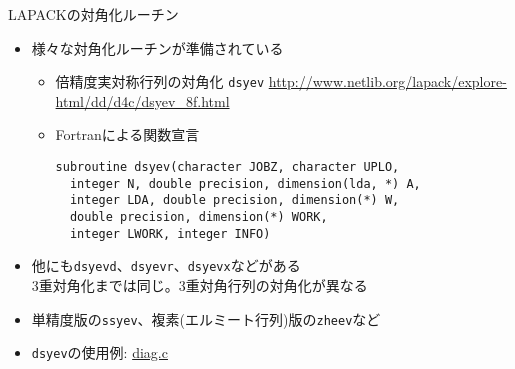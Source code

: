 \begin{frame}[t,fragile]{LAPACKの対角化ルーチン}
  \begin{itemize}
  \item 様々な対角化ルーチンが準備されている
    \begin{itemize}
    \item 倍精度実対称行列の対角化 {\tt dsyev}
      \url{http://www.netlib.org/lapack/explore-html/dd/d4c/dsyev_8f.html}
    \item Fortranによる関数宣言
\begin{lstlisting}
subroutine dsyev(character JOBZ, character UPLO,
  integer N, double precision, dimension(lda, *) A,
  integer LDA, double precision, dimension(*) W,
  double precision, dimension(*) WORK,
  integer LWORK, integer INFO)		
\end{lstlisting}
    \end{itemize}
  \item 他にも{\tt dsyevd}、{\tt dsyevr}、{\tt dsyevx}などがある \\
    3重対角化までは同じ。3重対角行列の対角化が異なる
  \item 単精度版の{\tt ssyev}、複素(エルミート行列)版の{\tt zheev}など
  \item {\tt dsyev}の使用例: \href{https://github.com/todo-group/computer-experiments/blob/master/exercise/eigenvalue_problem/diag.c}{diag.c}
  \end{itemize}
\end{frame}
